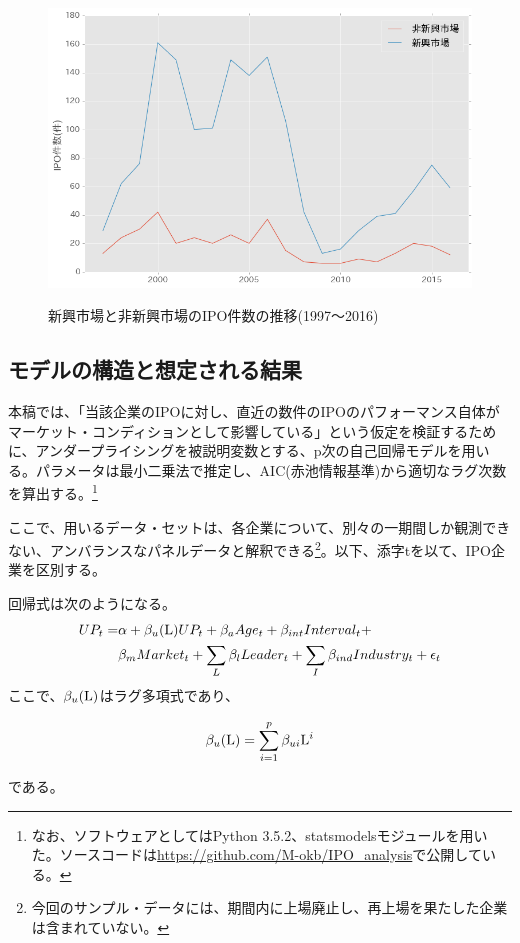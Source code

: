 \documentclass{jsarticle}
\begin{document}
\begin{figure}[!h]
  \begin{center}
  \caption{新興市場と非新興市場のIPO件数の推移(1997〜2016)}
    \includegraphics[clip,width=14cm]{./rising.png}
    \label{rising}
  \end{center}
\end{figure}

\newpage


\subsection{モデルの構造と想定される結果}
本稿では、「当該企業のIPOに対し、直近の数件のIPOのパフォーマンス自体がマーケット・コンディションとして影響している」という仮定を検証するために、アンダープライシングを被説明変数とする、p次の自己回帰モデルを用いる。パラメータは最小二乗法で推定し、AIC(赤池情報基準)から適切なラグ次数を算出する。\footnote[13]{なお、ソフトウェアとしてはPython 3.5.2、statsmodelsモジュールを用いた。ソースコードは\url{https://github.com/M-okb/IPO_analysis}で公開している。}\par
ここで、用いるデータ・セットは、各企業について、別々の一期間しか観測できない、アンバランスなパネルデータと解釈できる\footnote[14]{今回のサンプル・データには、期間内に上場廃止し、再上場を果たした企業は含まれていない。}。以下、添字tを以て、IPO企業を区別する。\\ \par
回帰式は次のようになる。\\ 
\begin{equation}
\label{reg}
\begin{split}
	UP_t = &\alpha + \beta_u ({\rm L}) UP_t + \beta_a Age_t + \beta_{int} Interval_t + \\
	 &\beta_m Market_t + \sum_{L} \beta_l Leader_t +  \sum_{I} \beta_{ind} Industry_t + \epsilon_t
\end{split}
\end{equation}
\newpage
ここで、$\beta_u({\rm L})$はラグ多項式であり、\par
\begin{equation}
\beta_u({\rm L}) = \sum_{i=1}^p \beta_{ui} {\rm L}^i \nonumber
\end{equation}\par
である。\\ \par
\end{document}
